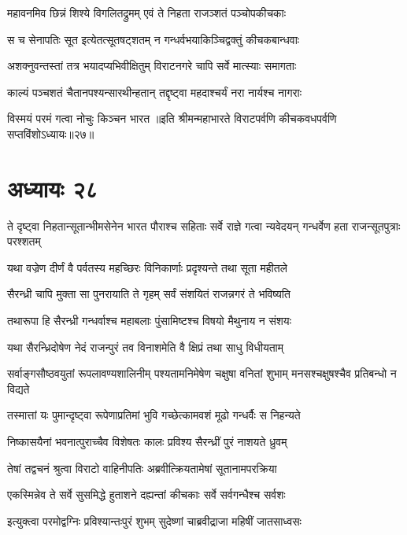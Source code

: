 \twolineshloka
{महावनमिव छिन्नं शिश्ये विगलितद्रुमम्}
{एवं ते निहता राजञ्शतं पञ्चोपकीचकाः}


\twolineshloka
{स च सेनापतिः सूत इत्येतत्सूतषट्शतम्}
{न गन्धर्वभयाकिञ्चिद्वक्तुं कीचकबान्धवाः}


\twolineshloka
{अशक्नुवन्तस्तां तत्र भयादप्यभिवीक्षितुम्}
{विराटनगरे चापि सर्वे मात्स्याः समागताः}


\twolineshloka
{काल्यं पञ्चशतं चैतानपश्यन्सारथीन्हतान्}
{तद्दृष्ट्वा महदाश्चर्यं नरा नार्यश्च नागराः}


\onelineshloka
{विस्मयं परमं गत्वा नोचुः किञ्चन भारत}
॥इति श्रीमन्महाभारते विराटपर्वणि कीचकवधपर्वणि सप्तविंशोऽध्यायः॥२७॥

\chapter{अध्यायः २८}

\threelineshloka
{ते दृष्ट्वा निहतान्सूतान्भीमसेनेन भारत}
{पौराश्च सहिताः सर्वे राज्ञे गत्वा न्यवेदयन्}
{गन्धर्वेण हता राजन्सूतपुत्राः परश्शतम्}


\twolineshloka
{यथा वज्रेण दीर्णं वै पर्वतस्य महच्छिरः}
{विनिकार्णाः प्रदृश्यन्ते तथा सूता महीतले}


\twolineshloka
{सैरन्ध्री चापि मुक्ता सा पुनरायाति ते गृहम्}
{सर्वं संशयितं राजन्नगरं ते भविष्यति}


\twolineshloka
{तथारूपा हि सैरन्ध्री गन्धर्वाश्च महाबलाः}
{पुंसामिष्टश्च विषयो मैथुनाय न संशयः}


\twolineshloka
{यथा सैरन्ध्रिदोषेण नेदं राजन्पुरं तव}
{विनाशमेति वै क्षिप्रं तथा साधु विधीयताम्}


\threelineshloka
{सर्वाङ्गसौष्ठवयुतां रूपलावण्यशालिनीम्}
{पश्यतामनिमेषेण चक्षुषा वनितां शुभाम्}
{मनसश्चक्षुषश्चैव प्रतिबन्धो न विद्यते}


\twolineshloka
{तस्मात्तां यः पुमान्दृष्ट्वा रूपेणाप्रतिमां भुवि}
{गच्छेत्कामवशं मूढो गन्धर्वैः स निहन्यते}


\twolineshloka
{निष्कासयैनां भवनात्पुराच्चैव विशेषतः}
{कालः प्रविश्य सैरन्ध्रीं पुरं नाशयते ध्रुवम्}



\twolineshloka
{तेषां तद्वचनं श्रुत्वा विराटो वाहिनीपतिः}
{अब्रवीत्क्रियतामेषां सूतानामपरक्रिया}


\twolineshloka
{एकस्मिन्नेव ते सर्वे सुसमिद्धे हुताशने}
{दह्यन्तां कीचकाः सर्वे सर्वगन्धैश्च सर्वशः}


\twolineshloka
{इत्युक्त्वा परमोद्वग्निः प्रविश्यान्तःपुरं शुभम्}
{सुदेष्णां चाब्रवीद्राजा महिषीं जातसाध्वसः}


